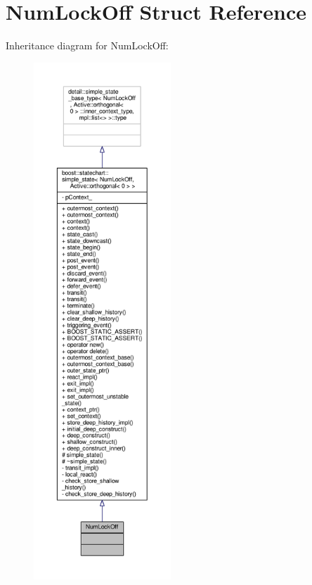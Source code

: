 \hypertarget{struct_num_lock_off}{}\section{Num\+Lock\+Off Struct Reference}
\label{struct_num_lock_off}


Inheritance diagram for Num\+Lock\+Off\+:
\nopagebreak
\begin{figure}[H]
\begin{center}
\leavevmode
\includegraphics[height=550pt]{struct_num_lock_off__inherit__graph}
\end{center}
\end{figure}


